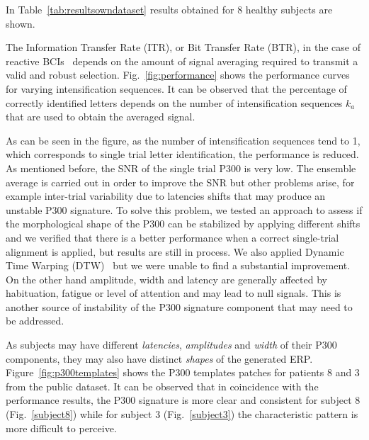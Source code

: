 \documentclass[utf8]{frontiersSCNS} %
\begin{document}
In Table~\ref{tab:resultsowndataset} results obtained for 8 healthy subjects are shown.   



The Information Transfer Rate (ITR), or Bit Transfer Rate (BTR), in the case of reactive BCIs~\citep{WolpawJonathanR2012}  depends on the amount of signal averaging required to transmit a valid and robust selection.  Fig.~\ref{fig:performance} shows the performance curves for varying intensification sequences. It can be observed that the percentage of correctly identified letters depends on the number of intensification sequences $k_a$ that are used to obtain the averaged signal.


As can be seen in the figure, as the number of intensification sequences tend to 1, which corresponds to single trial letter identification, the performance is reduced. As mentioned before, the SNR of the single trial P300 is very low. The ensemble average is carried out in order to improve the SNR but other problems arise, for example inter-trial variability due to latencies shifts that may produce an unstable P300 signature. To solve this problem, we tested an approach to assess if the morphological shape of the P300 can be stabilized by applying different shifts and we verified that there is a better performance when a correct single-trial alignment is applied, but results are still in process.  We also applied Dynamic Time Warping (DTW)~\citep{Casarotto2005} but we were unable to find a substantial improvement.     On the other hand amplitude, width and latency are generally affected by habituation, fatigue or level of attention and may lead to null signals\citep{Ouyang2017}. This is another source of instability of the P300 signature component that may need to be addressed.

As subjects may have different \textit{latencies}, \textit{amplitudes} and \textit{width} of their P300 components, they may also have distinct \textit{shapes} of the generated ERP.  Figure~\ref{fig:p300templates} shows the P300 templates patches for patients 8 and 3 from the public dataset. It can be observed that in coincidence with the performance results, the P300 signature is more clear and consistent for subject 8 (Fig.~\ref{subject8})  while for subject 3 (Fig.~\ref{subject3}) the characteristic pattern is more difficult to perceive.
\end{document}
